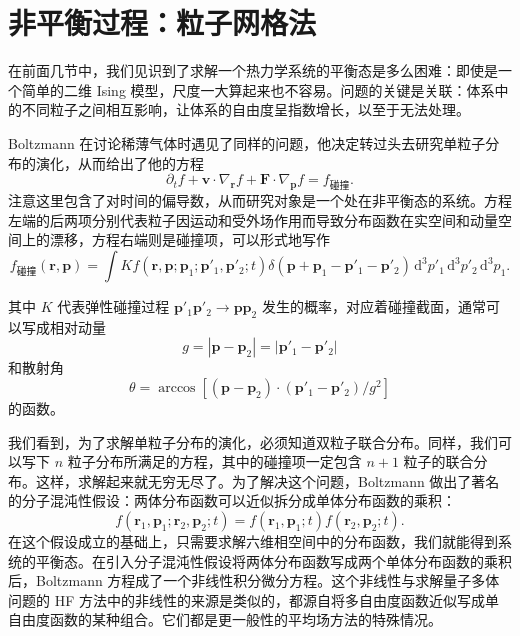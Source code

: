 \section{非平衡过程：粒子网格法}

在前面几节中，我们见识到了求解一个热力学系统的平衡态是多么困难：即使是一个简单的二维 Ising 模型，尺度一大算起来也不容易。问题的关键是关联：体系中的不同粒子之间相互影响，让体系的自由度呈指数增长，以至于无法处理。

Boltzmann 在讨论稀薄气体时遇见了同样的问题，他决定转过头去研究单粒子分布的演化，从而给出了他的方程
\begin{equation}
\partial_t f+\mathbf v\cdot\nabla_{\mathbf r}f+\mathbf F\cdot\nabla_{\mathbf p}f=f_{\text{碰撞}}.
\tag{7.5.1}
\end{equation}
注意这里包含了对时间的偏导数，从而研究对象是一个处在非平衡态的系统。方程左端的后两项分别代表粒子因运动和受外场作用而导致分布函数在实空间和动量空间上的漂移，方程右端则是碰撞项，可以形式地写作
\begin{equation}
f_{\text{碰撞}}(\mathbf r,\mathbf p)=\int K f(\mathbf r,\mathbf p;\mathbf p_1;\mathbf p'_1,\mathbf p'_2;t)\delta(\mathbf p+\mathbf p_1-\mathbf p'_1-\mathbf p'_2)\,\mathrm d^3p'_1\,\mathrm d^3p'_2\,\mathrm d^3p_1.
\tag{7.5.2}
\end{equation}

其中 $K$ 代表弹性碰撞过程 $\mathbf p'_1\mathbf p'_2\to \mathbf p\mathbf p_2$ 发生的概率，对应着碰撞截面，通常可以写成相对动量
\begin{equation}
g=|\mathbf p-\mathbf p_2|=|\mathbf p'_1-\mathbf p'_2|
\tag{7.5.3}
\end{equation}
和散射角
\begin{equation}
\theta=\arccos\!\left[(\mathbf p-\mathbf p_2)\cdot(\mathbf p'_1-\mathbf p'_2)/g^2\right]
\tag{7.5.4}
\end{equation}
的函数。

我们看到，为了求解单粒子分布的演化，必须知道双粒子联合分布。同样，我们可以写下 $n$ 粒子分布所满足的方程，其中的碰撞项一定包含 $n+1$ 粒子的联合分布。这样，求解起来就无穷无尽了。为了解决这个问题，Boltzmann 做出了著名的分子混沌性假设：两体分布函数可以近似拆分成单体分布函数的乘积：
\begin{equation}
f(\mathbf r_1,\mathbf p_1;\mathbf r_2,\mathbf p_2;t)=f(\mathbf r_1,\mathbf p_1;t)f(\mathbf r_2,\mathbf p_2;t).
\tag{7.5.5}
\end{equation}
在这个假设成立的基础上，只需要求解六维相空间中的分布函数，我们就能得到系统的平衡态。在引入分子混沌性假设将两体分布函数写成两个单体分布函数的乘积后，Boltzmann 方程成了一个非线性积分微分方程。这个非线性与求解量子多体问题的 HF 方法中的非线性的来源是类似的，都源自将多自由度函数近似写成单自由度函数的某种组合。它们都是更一般性的平均场方法的特殊情况。

